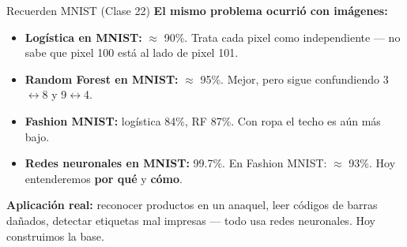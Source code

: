 \documentclass[aspectratio=169, 11pt]{beamer}
\begin{document}
\begin{frame}{Recuerden MNIST (Clase 22)}
  \vspace{-4pt}
  {\footnotesize\color{arcaDark}\bfseries
    El mismo problema ocurri\'o con im\'agenes:}

  \vspace{6pt}
  {\footnotesize
  \begin{itemize}\setlength{\itemsep}{5pt}
    \item[{\color{arcaRed}\scriptsize\faArrowRight}]
      \textbf{Log\'istica en MNIST:} $\approx$ 90\%. Trata cada pixel
      como independiente --- no sabe que pixel 100 est\'a al lado de pixel 101.
    \item[{\color{codeOrange}\scriptsize\faArrowRight}]
      \textbf{Random Forest en MNIST:} $\approx$ 95\%. Mejor, pero sigue
      confundiendo 3$\leftrightarrow$8 y 9$\leftrightarrow$4.
    \item[{\color{arcaRed}\scriptsize\faArrowRight}]
      \textbf{Fashion MNIST:} log\'istica 84\%, RF 87\%.
      Con ropa el techo es a\'un m\'as bajo.
    \item[{\color{codeGreen}\scriptsize\faArrowRight}]
      \textbf{Redes neuronales en MNIST:} 99.7\%.
      En Fashion MNIST: $\approx$ 93\%.
      Hoy entenderemos \textbf{por qu\'e} y \textbf{c\'omo}.
  \end{itemize}
  }

  \vspace{4pt}
  \begin{tcolorbox}[colback=codeGreen!8, colframe=codeGreen, boxrule=0.5pt, arc=2pt,
    left=6pt, right=6pt, top=4pt, bottom=4pt]
    {\scriptsize\color{arcaDark}
    \faLightbulb\hspace{4pt}\textbf{Aplicaci\'on real:} reconocer productos
    en un anaquel, leer c\'odigos de barras da\~nados, detectar etiquetas
    mal impresas --- todo usa redes neuronales. Hoy construimos la base.}
  \end{tcolorbox}
\end{frame}
\end{document}
